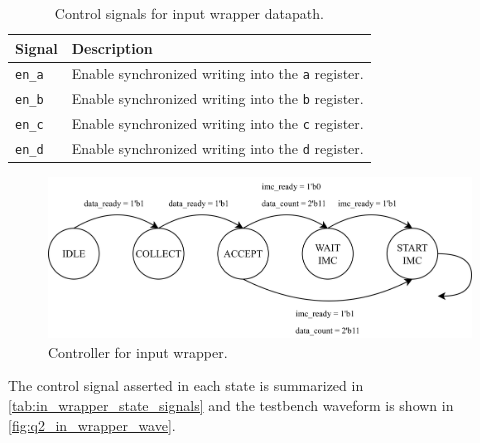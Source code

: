 \documentclass[../main.tex]{subfiles}
\begin{document}
\begin{table}[h]
    \centering
    \renewcommand{\arraystretch}{1.2}
    \setlength{\tabcolsep}{8pt}

    \begin{tabularx}{\textwidth}{@{}lX@{}}
        \toprule
        \textbf{Signal} & \textbf{Description} \\
        \midrule
        \texttt{en\_a}          & Enable synchronized writing into the \texttt{a} register. \\
        \texttt{en\_b}          & Enable synchronized writing into the \texttt{b} register. \\
        \texttt{en\_c}          & Enable synchronized writing into the \texttt{c} register. \\
        \texttt{en\_d}          & Enable synchronized writing into the \texttt{d} register. \\
        \bottomrule
    \end{tabularx}

    \caption{Control signals for input wrapper datapath.}
    \label{tab:q2_in_wrap_sig}
\end{table}

\begin{figure}[h]
    \centering
    \includegraphics[width=\linewidth]{assets/in_wrap_cont.png}
    \caption{Controller for input wrapper.}
    \label{fig:q2_in_wrap_cont}
\end{figure}

\newpage

The control signal asserted in each state is summarized in \cref{tab:in_wrapper_state_signals} and the testbench waveform is shown in \cref{fig:q2_in_wrapper_wave}.
\end{document}
